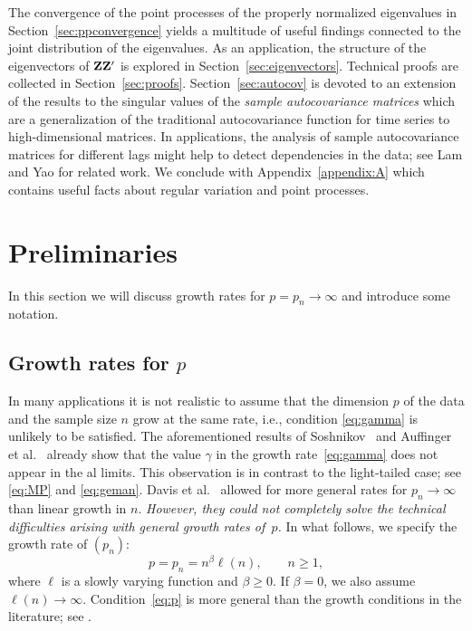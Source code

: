 The convergence of the point processes of the properly normalized eigenvalues in Section~\ref{sec:ppconvergence} yields a multitude of useful findings connected to the joint distribution of the eigenvalues. As an application, the structure of the eigenvectors of ${\mathbf Z}{\mathbf Z}'$ is explored in Section~\ref{sec:eigenvectors}.
Technical proofs are collected in Section~\ref{sec:proofs}.
Section~\ref{sec:autocov} is devoted to an extension of the results to the singular values of the 
{\em sample autocovariance matrices}  which are a generalization of the traditional autocovariance function for time series to high-dimensional matrices. In applications, the analysis of sample autocovariance matrices for different lags might help to detect dependencies in the data; see Lam and Yao \cite{lam:yao} for related work.
 We conclude with Appendix~\ref{appendix:A} which contains useful facts about regular variation and point processes.





\section{Preliminaries}\label{sec:2}
In this section we will discuss growth rates for $p=p_n\to\infty$ and introduce some notation. 
\subsection{Growth rates for $p$}
In many applications it is not realistic to assume 
that the dimension $p$ of the data and the sample size $n$ grow at the same rate, i.e., condition \eqref{eq:gamma} is unlikely to be
satisfied.
The aforementioned results of Soshnikov~\cite{soshnikov:2004,soshnikov:2006} and Auffinger et al.~\cite{auffinger:arous:peche:2009} already show that the value $\gamma$ in the growth
rate~\eqref{eq:gamma} does not appear in the \ds al limits. 
This observation is in contrast to the light-tailed case; see \eqref{eq:MP} 
and \eqref{eq:geman}.  Davis et al.~\cite{davis:mikosch:pfaffel:2015,davis:pfaffel:stelzer:2014} allowed for more general rates for
$p_n\to\infty$ than linear growth in $n$. {\em However, they could not completely solve the technical difficulties arising with general growth rates of~$p$.}
In what follows, we 
specify the growth rate of $(p_n)$:
\begin{equation}\label{eq:p}
p=p_n=n^\beta \ell(n), \qquad n\ge1,\tag{$C_p(\beta)$}
\end{equation}
where $\ell$ is a slowly varying function and $\beta\ge 0$. If $\beta =0$, we also assume $\ell(n) \to \infty$. 
Condition~\ref{eq:p} is more general than the growth conditions in the literature; see 
\cite{auffinger:arous:peche:2009,davis:mikosch:pfaffel:2015,davis:pfaffel:stelzer:2014}. 

